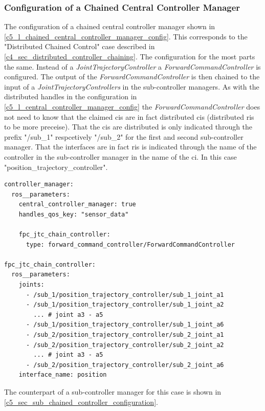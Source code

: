 \subsubsection{Configuration of a Chained Central Controller Manager}\label{c5_configuration_of_chained_central_controller_manager}
The configuration of a chained central controller manager shown in \autoref{c5_l_chained_central_controller_manager_config}. This corresponds to the "Distributed Chained Control" case described in \autoref{c4_sec_distributed_controller_chaining}. The configuration for the most parts the same. Instead of a \textit{JointTrajectoryController} a \textit{ForwardCommandController} is configured. The output of the \textit{ForwardCommandController} is then chained to the input of a \textit{JointTrajectoryControllers} in the sub-controller managers. As with the distributed \glspl{handle} in the configuration in \autoref{c5_l_central_controller_manager_config} the \textit{ForwardCommandController} does not need to know that the claimed \glspl{ci} are in fact distributed \glspl{ci} (distributed \glspl{ri} to be more preceise). That the \glspl{ci}
are distributed is only indicated through the prefix "/sub\_1" respcetively "/sub\_2" for the first and second sub-controller manager. That the interfaces are in fact \glspl{ri} is indicated through the name of the controller in the sub-controller manager in the name of the \gls{ci}. In this case "position\_trajectory\_controller". \newline
\lstset{language=yaml,basicstyle=\small}
\begin{lstlisting}[caption=Example configuration of a chained central controller manager.,label=c5_l_chained_central_controller_manager_config]
controller_manager:
  ros__parameters:
    central_controller_manager: true
    handles_qos_key: "sensor_data"

    fpc_jtc_chain_controller:
      type: forward_command_controller/ForwardCommandController

fpc_jtc_chain_controller:
  ros__parameters:
    joints:
      - /sub_1/position_trajectory_controller/sub_1_joint_a1
      - /sub_1/position_trajectory_controller/sub_1_joint_a2
        ... # joint a3 - a5
      - /sub_1/position_trajectory_controller/sub_1_joint_a6
      - /sub_2/position_trajectory_controller/sub_2_joint_a1
      - /sub_2/position_trajectory_controller/sub_2_joint_a2
        ... # joint a3 - a5
      - /sub_2/position_trajectory_controller/sub_2_joint_a6
    interface_name: position
\end{lstlisting}
The counterpart of a sub-controller manager for this case is shown in \autoref{c5_sec_sub_chained_controller_configuration}.
